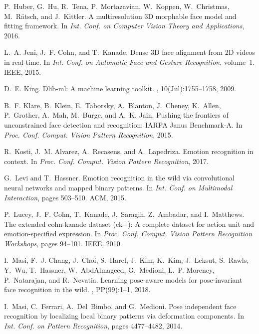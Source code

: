 \documentclass[a4paper, 10pt, conference]{ieeeconf}
\begin{document}
\begin{thebibliography}{10}
P.~Huber, G.~Hu, R.~Tena, P.~Mortazavian, W.~Koppen, W.~Christmas, M.~Rätsch,
  and J.~Kittler.
\newblock A multiresolution {3D} morphable face model and fitting framework.
\newblock In {\em Int. Conf. on Computer Vision Theory and Applications}, 2016.

L.~A. Jeni, J.~F. Cohn, and T.~Kanade.
\newblock Dense {3D} face alignment from {2D} videos in real-time.
\newblock In {\em Int. Conf. on Automatic Face and Gesture Recognition},
  volume~1. IEEE, 2015.

D.~E. King.
\newblock Dlib-ml: A machine learning toolkit.
, 10(Jul):1755--1758, 2009.

B.~F. Klare, B.~Klein, E.~Taborsky, A.~Blanton, J.~Cheney, K.~Allen,
  P.~Grother, A.~Mah, M.~Burge, and A.~K. Jain.
\newblock Pushing the frontiers of unconstrained face detection and
  recognition: {IARPA} {J}anus {B}enchmark-{A}.
\newblock In {\em Proc. Conf. Comput. Vision Pattern Recognition}, 2015.

R.~Kosti, J.~M. Alvarez, A.~Recasens, and A.~Lapedriza.
\newblock Emotion recognition in context.
\newblock In {\em Proc. Conf. Comput. Vision Pattern Recognition}, 2017.

G.~Levi and T.~Hassner.
\newblock Emotion recognition in the wild via convolutional neural networks and
  mapped binary patterns.
\newblock In {\em Int. Conf. on Multimodal Interaction}, pages 503--510. ACM,
  2015.

P.~Lucey, J.~F. Cohn, T.~Kanade, J.~Saragih, Z.~Ambadar, and I.~Matthews.
\newblock The extended cohn-kanade dataset (ck+): A complete dataset for action
  unit and emotion-specified expression.
\newblock In {\em Proc. Conf. Comput. Vision Pattern Recognition Workshops},
  pages 94--101. IEEE, 2010.

I.~Masi, F.~J. Chang, J.~Choi, S.~Harel, J.~Kim, K.~Kim, J.~Leksut, S.~Rawls,
  Y.~Wu, T.~Hassner, W.~AbdAlmageed, G.~Medioni, L.~P. Morency, P.~Natarajan,
  and R.~Nevatia.
\newblock Learning pose-aware models for pose-invariant face recognition in the
  wild.
, PP(99):1--1, 2018.

I.~Masi, C.~Ferrari, A.~Del~Bimbo, and G.~Medioni.
\newblock Pose independent face recognition by localizing local binary patterns
  via deformation components.
\newblock In {\em Int. Conf. on Pattern Recognition}, pages 4477--4482, 2014.


\end{thebibliography}
\end{document}
